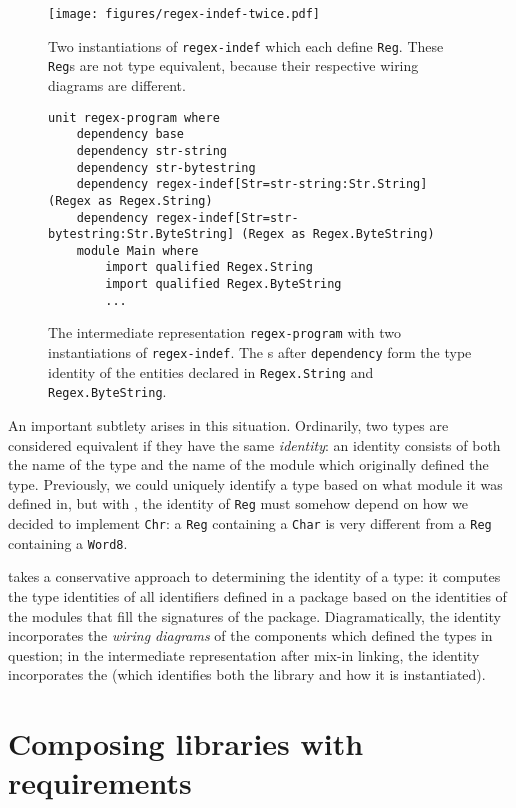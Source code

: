 \begin{figure}
\center\texttt{[image: figures/regex-indef-twice.pdf]}
\caption{Two instantiations of \texttt{regex-indef} which each define
\texttt{Reg}.  These \texttt{Reg}s are not type equivalent, because
their respective wiring diagrams are different.}
\label{fig:regex-indef-twice}
\end{figure}

\begin{figure}
\begin{lstlisting}
unit regex-program where
    dependency base
    dependency str-string
    dependency str-bytestring
    dependency regex-indef[Str=str-string:Str.String] (Regex as Regex.String)
    dependency regex-indef[Str=str-bytestring:Str.ByteString] (Regex as Regex.ByteString)
    module Main where
        import qualified Regex.String
        import qualified Regex.ByteString
        ...
\end{lstlisting}
\caption{The intermediate representation \texttt{regex-program} with two instantiations of \texttt{regex-indef}.  The \uid{}s after \texttt{dependency} form the type identity of the entities declared in \texttt{Regex.String} and \texttt{Regex.ByteString}.}
\label{fig:matcher-twice-bkp}
\end{figure}

An important subtlety arises in this situation.  Ordinarily, two types
are considered equivalent if they have the same \emph{identity}: an
identity consists of both the name of the type and the name of the
module which originally defined the type.  Previously, we could
uniquely identify a type based on what module it was defined in,
but with \Backpack{}, the identity of \verb|Reg| must somehow
depend on how we decided to implement \verb|Chr|: a \verb|Reg|
containing a \verb|Char| is very different from a \verb|Reg| containing
a \verb|Word8|.

\Backpack{} takes a conservative approach to determining the
identity of a type: it computes the type identities of all identifiers
defined in a package based on the identities of the modules that fill
the signatures of the package.  Diagramatically, the identity
incorporates the \emph{wiring diagrams} of the components which defined
the types in question; in the intermediate representation after mix-in
linking, the identity incorporates the \uid{} (which
identifies both the library and how it is instantiated).

\section{Composing libraries with requirements}

